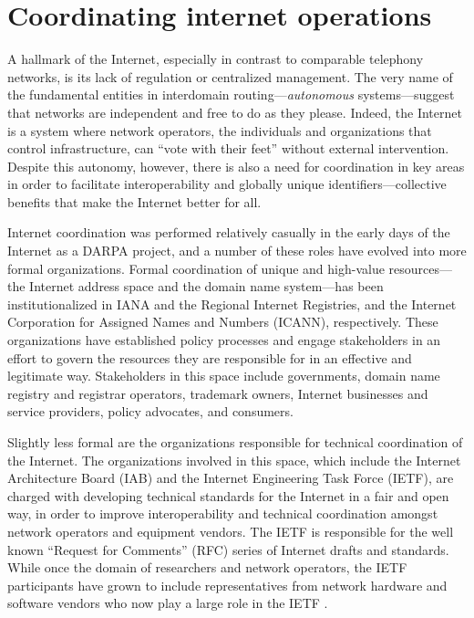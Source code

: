 \section{Coordinating internet operations}

A hallmark of the Internet, especially in contrast to comparable telephony
networks, is its lack of regulation or centralized management. The very name of
the fundamental entities in interdomain routing---\emph{autonomous}
systems---suggest that networks are independent and free to do as they please.
Indeed, the Internet is a system where network operators, the individuals and
organizations that control infrastructure, can ``vote with their feet'' without
external intervention. Despite this autonomy, however, there is also a need for
coordination in key areas in order to facilitate interoperability and globally
unique identifiers---collective benefits that make the Internet better for
all.

Internet coordination was performed relatively casually in the early days of
the Internet as a DARPA project, and a number of these roles have evolved into
more formal organizations. Formal coordination of unique and high-value
resources---the Internet address space and the domain name system---has been
institutionalized in IANA and the Regional Internet Registries, and the
Internet Corporation for Assigned Names and Numbers (ICANN), respectively.
These organizations have established policy processes and engage stakeholders
in an effort to govern the resources they are responsible for in an effective
and legitimate way. Stakeholders in this space include governments, domain name
registry and registrar operators, trademark owners, Internet businesses and
service providers, policy advocates, and consumers.

Slightly less formal are the organizations responsible for technical
coordination of the Internet. The organizations involved in this space, which
include the Internet Architecture Board (IAB) and the Internet Engineering Task
Force (IETF), are charged with developing technical standards for the Internet
in a fair and open way, in order to improve interoperability and technical
coordination amongst network operators and equipment vendors. The IETF is
responsible for the well known ``Request for Comments'' (RFC) series of Internet
drafts and standards. While once the domain of researchers and network
operators, the IETF participants have grown to include representatives from
network hardware and software vendors who now play a large role in the IETF
\cite{Li:2011vn}.

